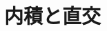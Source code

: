 \documentclass[../../topic_linear-algebra]{subfiles}
\begin{document}
\chapter{内積と直交}
\end{document}
